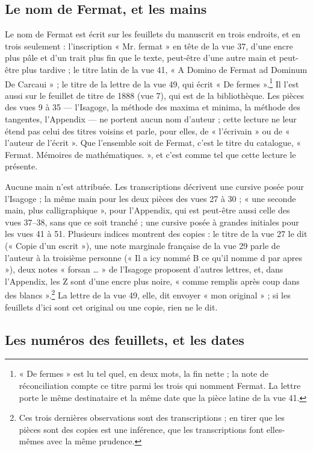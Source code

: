 \documentclass[11pt,a4paper]{article}
\begin{document}
\subsection*{Le nom de Fermat, et les mains}

Le nom de Fermat est écrit sur les feuillets du manuscrit en trois endroits, et
en trois seulement : l'inscription « Mr. fermat » en tête de la vue 37, d'une
encre plus pâle et d'un trait plus fin que le texte, peut-être d'une autre main
et peut-être plus tardive ; le titre latin de la vue 41, « A Domino de Fermat
ad Dominum De Carcaui » ; le titre de la lettre de la vue 49, qui écrit « De
fermes ».\footnote{« De fermes » est lu tel quel, en deux mots, la fin nette ;
la note de réconciliation compte ce titre parmi les trois qui nomment Fermat.
La lettre porte le même destinataire et la même date que la pièce latine de la
vue 41.} Il l'est aussi sur le feuillet de titre de 1888 (vue 7), qui est de la
bibliothèque. Les pièces des vues 9 à 35 — l'Isagoge, la méthode des maxima et
minima, la méthode des tangentes, l'Appendix — ne portent aucun nom d'auteur ;
cette lecture ne leur étend pas celui des titres voisins et parle, pour elles,
de « l'écrivain » ou de « l'auteur de l'écrit ». Que l'ensemble soit de Fermat,
c'est le titre du catalogue, « Fermat. Mémoires de mathématiques. », et c'est
comme tel que cette lecture le présente.

Aucune main n'est attribuée. Les transcriptions décrivent une cursive posée
pour l'Isagoge ; la même main pour les deux pièces des vues 27 à 30 ; « une
seconde main, plus calligraphique », pour l'Appendix, qui est peut-être aussi
celle des vues 37–38, sans que ce soit tranché ; une cursive posée à grandes
initiales pour les vues 41 à 51. Plusieurs indices montrent des copies : le
titre de la vue 27 le dit (« Copie d'un escrit »), une note marginale française
de la vue 29 parle de l'auteur à la troisième personne (« Il a icy nommé B ce
qu'il nomme d par apres »), deux notes « forsan … » de l'Isagoge proposent
d'autres lettres, et, dans l'Appendix, les Z sont d'une encre plus noire,
« comme remplis après coup dans des blancs ».\footnote{Ces trois dernières
observations sont des transcriptions ; en tirer que les pièces sont des copies
est une inférence, que les transcriptions font elles-mêmes avec la même
prudence.} La lettre de la vue 49, elle, dit envoyer « mon original » ; si
les feuillets d'ici sont cet original ou une copie, rien ne le dit.

\subsection*{Les numéros des feuillets, et les dates}
\end{document}

